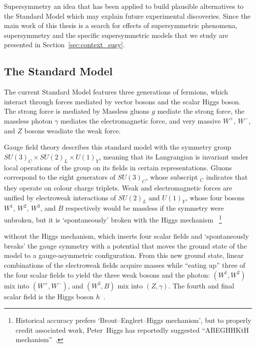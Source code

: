 Supersymmetry an idea that has been applied to build plausible alternatives
to the Standard Model which may explain future experimental discoveries.
Since the main work of this thesis is a search for effects of supersymmetric
phenomena, supersymmetry and the specific supersymmetric models that we study
are presented in Section~\ref{sec:context_susy}.


\subsection{The Standard Model}
\label{sec:context_sm}
The current Standard Model features three generations of fermions,
which interact through forces mediated by vector bosons
and the scalar Higgs boson.
The strong force is mediated by
Massless gluons $g$ mediate the strong force,
the massless photon $\gamma$ mediates the electromagnetic force,
and very massive $W^+$, $W^-$, and $Z$ bosons weadiate the weak force.

Gauge field theory describes this standard model with the symmetry group
$SU\!(3)_C \times SU\!(2)_L \times U\!(1)_Y$,
meaning that its Langrangian is invariant under local operations of the group
on its fields in certain representations.
Gluons correspond to the eight generators of $SU\!(3)_C$, whose subscript $_C$
indicates that they operate on colour charge triplets.
Weak and electromagnetic forces are unified by electroweak interactions of
$SU\!(2)_L$ and $U\!(1)_Y$, whose
four bosons $W^1$, $W^2$, $W^3$, and $B$ respectively would be massless
if the symmetry were unbroken,
but it is `spontaneously' broken with the
Higgs mechanism~\cite{
higgs1964broken,
englert1964broken
}%
\footnote{%
Historical accuracy prefers `Brout–Englert–Higgs mechanism', but to
properly credit associated work, Peter~Higgs has reportedly suggested
``ABEGHHKtH mechanism''~\cite{close2011infinity}.%
}


without the Higgs mechanism, which inserts four scalar fields and
`spontaneously breaks' the gauge symmetry with a potential that moves the
ground state of the model to a gauge-asymmetric configuration.
From this new ground state, linear combinations of the electroweak fields
acquire masses while ``eating up'' three of the four scalar fields to yield
the three weak bosons and the photon:
$(W^1, W^2)$ mix into $(W^+, W^-)$, and $(W^3, B)$ mix into $(Z, \gamma)$.
The fourth and final scalar field is the Higgs boson $h$~\cite{
rubakov1999classical,
cottingham2007greenwood
}.



